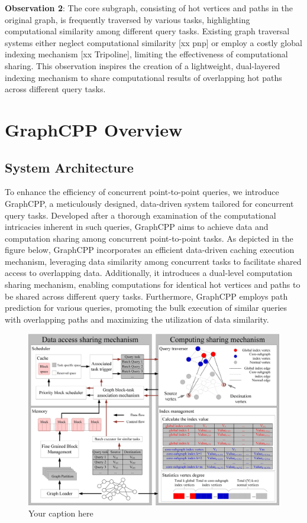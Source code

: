 \documentclass[lettersize,journal]{IEEEtran} %
\begin{document}
{\bf{Observation 2}}: The core subgraph, consisting of hot vertices and paths in the original graph, is frequently traversed by various tasks, highlighting computational similarity among different query tasks. Existing graph traversal systems either neglect computational similarity [xx pnp] or employ a costly global indexing mechanism [xx Tripoline], limiting the effectiveness of computational sharing. This observation inspires the creation of a lightweight, dual-layered indexing mechanism to share computational results of overlapping hot paths across different query tasks. 

\section{GraphCPP Overview}

\subsection{System Architecture}
To enhance the efficiency of concurrent point-to-point queries, we introduce GraphCPP, a meticulously designed, data-driven system tailored for concurrent query tasks. Developed after a thorough examination of the computational intricacies inherent in such queries, GraphCPP aims to achieve data and computation sharing among concurrent point-to-point tasks. As depicted in the figure below, GraphCPP incorporates an efficient data-driven caching execution mechanism, leveraging data similarity among concurrent tasks to facilitate shared access to overlapping data. Additionally, it introduces a dual-level computation sharing mechanism, enabling computations for identical hot vertices and paths to be shared across different query tasks. Furthermore, GraphCPP employs path prediction for various queries, promoting the bulk execution of similar queries with overlapping paths and maximizing the utilization of data similarity. 

\begin{figure}[!t]
    \centering
    \includegraphics[width=\columnwidth]{系统架构.png}
    \caption{Your caption here}
    \label{fig:系统架构}
  \end{figure}
  
\end{document}
